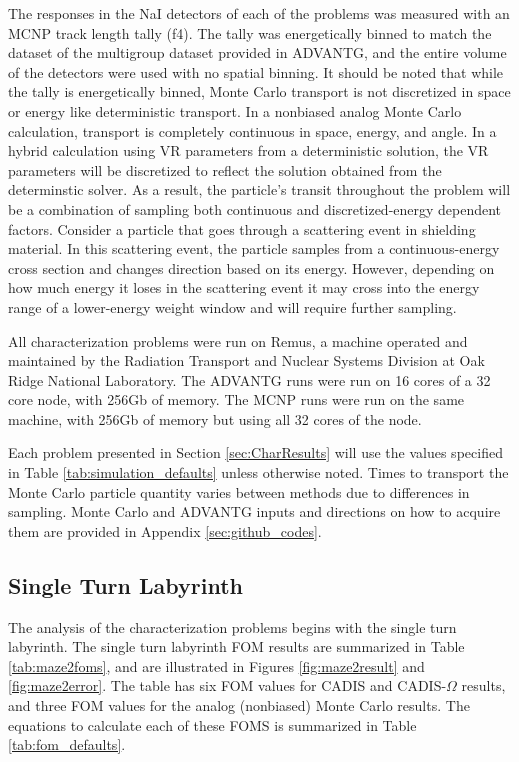 The responses in the NaI detectors of each of
the problems was measured with an MCNP track length tally (f4). The tally was
energetically binned to match the dataset of the multigroup dataset provided in
ADVANTG, and the entire volume of the detectors were used with no spatial
binning. It should be noted that while the tally is energetically binned, Monte
Carlo transport is not discretized in space or energy like deterministic
transport. In a nonbiased analog Monte Carlo calculation, transport is
completely continuous in space, energy, and angle. In a hybrid calculation using
VR parameters from a deterministic solution, the VR parameters will be
discretized to reflect the solution obtained from the determinstic solver. As a
result, the particle's transit throughout the
problem will be a combination of sampling both continuous and discretized-energy
dependent factors. Consider a particle that goes through a scattering event
in shielding material. In this scattering event, the particle samples from a
continuous-energy cross section and changes direction based on its energy.
However, depending on how much energy it loses in the scattering event it may
cross into the energy range of a lower-energy weight window and will require
further sampling.

All characterization problems were run on Remus, a machine operated and
maintained by the Radiation Transport and Nuclear Systems Division at Oak Ridge
National Laboratory. The ADVANTG runs were run on 16 cores of a 32 core node,
with 256Gb of memory. The MCNP runs were run on the same machine, with 256Gb of
memory but using all 32 cores of the node.

Each problem presented in Section \ref{sec:CharResults} will
use the values specified in Table \ref{tab:simulation_defaults}
unless otherwise noted.
Times to transport the Monte Carlo particle quantity varies between methods
due to differences in sampling. Monte Carlo and ADVANTG
inputs and directions on how to acquire them are
provided in Appendix \ref{sec:github_codes}.

\subsection{Single Turn Labyrinth}
\label{subsec:maze2}

The analysis of the characterization problems begins with the single turn
labyrinth.
The single turn labyrinth FOM results are summarized in Table \ref{tab:maze2foms},
and are illustrated in Figures \ref{fig:maze2result} and \ref{fig:maze2error}.
The table has six FOM values for CADIS and CADIS-$\Omega$ results, and three FOM
values for the analog (nonbiased) Monte Carlo results. The equations to
calculate each of these FOMS is summarized in Table \ref{tab:fom_defaults}.

